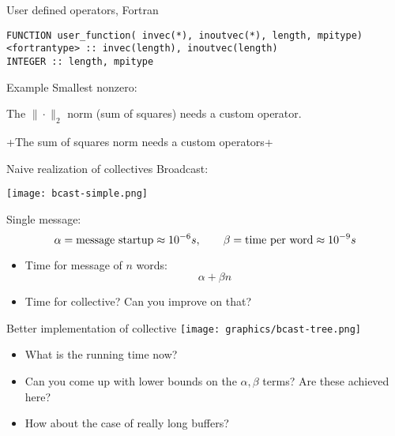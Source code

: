 \begin{fortran}
  \addtocounter{slidecount}{-1}
\begin{numberedframe}{User defined operators, Fortran}
\lstset{language=Fortran}
\begin{lstlisting}
FUNCTION user_function( invec(*), inoutvec(*), length, mpitype)
<fortrantype> :: invec(length), inoutvec(length) 
INTEGER :: length, mpitype
\end{lstlisting}
\end{numberedframe}
\end{fortran}


\begin{numberedframe}{Example}
  Smallest nonzero:
  
\end{numberedframe}

\begin{reviewframe}
  The $\|\cdot\|_2$ norm (sum of squares) needs a custom operator.
  
  \slackpollTF+The sum of squares norm needs a custom operators+
\end{reviewframe}


\begin{numberedframe}{Naive realization of collectives}
  Broadcast:
  
  \texttt{[image: bcast-simple.png]}

  Single message:
  \[ \alpha=\hbox{message startup}\approx 10^{-6}s,\qquad
  \beta=\hbox{time per word}\approx 10^{-9}s
  \]
  \begin{itemize}
  \item Time for message of $n$ words: \[ \alpha +\beta n \]
  \item Time for collective? Can you improve on that?
  \end{itemize}

\end{numberedframe}

\begin{numberedframe}{Better implementation of collective}
  \texttt{[image: graphics/bcast-tree.png]}
  
  \begin{itemize}
  \item
    What is the running time now?
  \item
    Can you come up with lower bounds on the $\alpha,\beta$ terms? Are
    these achieved here?
  \item How about the case of really long buffers?
  \end{itemize}

\end{numberedframe}

